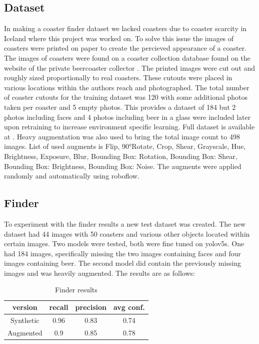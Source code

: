 \documentclass{article}
\begin{document}
\subsection{Dataset}
In making a coaster finder dataset we lacked coasters due to coaster scarcity in Iceland where this project was worked on.
To solve this issue the images of coasters were printed on paper to create the percieved appearance of a coaster. The images of coasters
were found on a coaster collection database found on the website of the private beercoaster collector \cite{euroCoasters}. The printed images were cut out and roughly sized proportionally to real coasters.
These cutouts were placed in various locations within the authors reach and photographed. The total number of coaster cutouts for the 
training dataset was 120 with some additional photos taken per coaster and 5 empty photos. This provides a dataset of 184 but 2 photos
including faces and 4 photos including beer in a glass were included later upon retraining to increase environment specific learning.
Full dataset is available at \cite{gdrive}.
Heavy augmentation was also used to bring the total image count to 498 images. List of used augments is Flip, 90°Rotate, Crop, Shear, Grayscale, Hue, Brightness, Exposure, Blur,
Bounding Box: Rotation, Bounding Box: Shear, Bounding Box: Brightness, Bounding Box: Noise. The augments were applied randomly and automatically using roboflow.

\subsection{Finder}

To experiment with the finder results a new test dataset was created. The new dataset had 44 images with 50 coasters and various other objects located
within certain images. Two models were tested, both were fine tuned on yolov5s. One had 184 images, specifically missing the two images containing faces and four images containing beer.
The second model did contain the previously missing images and was heavily augmented. The results are as follows: 

\begin{table}[H]
    \centering
    \begin{tabular}{ c|c c c } 
     version & recall & precision & avg conf. \\ \hline
     Synthetic & 0.96 & 0.83 & 0.74 \\ 
     Augmented & 0.9 & 0.85 &  0.78 \\ 
    \end{tabular}
    \caption{Finder results}
\end{table}
\end{document}
